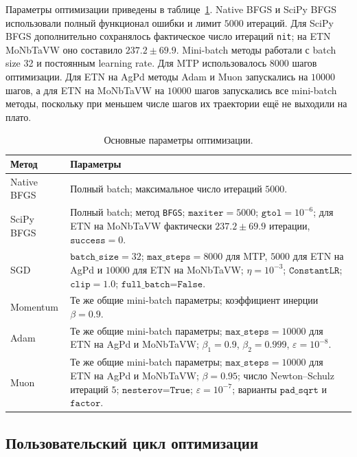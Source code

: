 Параметры оптимизации приведены в таблице~\ref{tab:optimization-config}. Native BFGS и SciPy BFGS использовали полный функционал ошибки и лимит \(5000\) итераций. Для SciPy BFGS дополнительно сохранялось фактическое число итераций \texttt{nit}; на ETN MoNbTaVW оно составило \(237.2 \pm 69.9\). Mini-batch методы работали с batch size 32 и постоянным learning rate. Для MTP использовалось \(8000\) шагов оптимизации. Для ETN на AgPd методы Adam и Muon запускались на \(10000\) шагов, а для ETN на MoNbTaVW на \(10000\) шагов запускались все mini-batch методы, поскольку при меньшем числе шагов их траектории ещё не выходили на плато.

\begin{table}[H]
    \centering
    \caption{Основные параметры оптимизации.}
    \label{tab:optimization-config}
    \small
    \begin{tabularx}{\textwidth}{p{}X}
        \toprule
        Метод & Параметры \\
        \midrule
        Native BFGS &
        Полный batch; максимальное число итераций \(5000\). \\
        SciPy BFGS &
        Полный batch; метод \texttt{BFGS}; \(\texttt{maxiter}=5000\); \(\texttt{gtol}=10^{-6}\); для ETN на MoNbTaVW фактически \(237.2 \pm 69.9\) итерации, \(\texttt{success}=0\). \\
        SGD &
        \(\texttt{batch\_size}=32\); \(\texttt{max\_steps}=8000\) для MTP, \(5000\) для ETN на AgPd и \(10000\) для ETN на MoNbTaVW; \(\eta=10^{-3}\); \(\texttt{ConstantLR}\); \(\texttt{clip}=1.0\); \(\texttt{full\_batch=False}\). \\
        Momentum &
        Те же общие mini-batch параметры; коэффициент инерции \(\beta=0.9\). \\
        Adam &
        Те же общие mini-batch параметры; \(\texttt{max\_steps}=10000\) для ETN на AgPd и MoNbTaVW; \(\beta_1=0.9\), \(\beta_2=0.999\), \(\varepsilon=10^{-8}\). \\
        Muon &
        Те же общие mini-batch параметры; \(\texttt{max\_steps}=10000\) для ETN на AgPd и MoNbTaVW; \(\beta=0.95\); число Newton--Schulz итераций \(5\); \(\texttt{nesterov=True}\); \(\varepsilon=10^{-7}\); варианты \(\texttt{pad\_sqrt}\) и \(\texttt{factor}\). \\
        \bottomrule
    \end{tabularx}
\end{table}

\subsection{Пользовательский цикл оптимизации}

